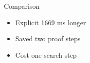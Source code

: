 \documentclass{beamer}
\begin{document}
\begin{frame}{Comparison}
	\begin{itemize}
		\item Explicit 1669 ms longer
		\item Saved two proof steps
		\item Cost one search step
	\end{itemize}
\end{frame}
\end{document}
